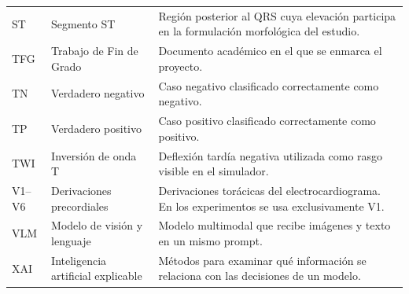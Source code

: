 {\begin{longtable}{@{}>{\raggedright\arraybackslash}p{2.20cm}>{\raggedright\arraybackslash}p{4.10cm}>{\raggedright\arraybackslash}p{7.95cm}@{}}
ST & Segmento ST & Región posterior al QRS cuya elevación participa en la formulación morfológica del estudio. \\
TFG & Trabajo de Fin de Grado & Documento académico en el que se enmarca el proyecto. \\
TN & Verdadero negativo & Caso negativo clasificado correctamente como negativo. \\
TP & Verdadero positivo & Caso positivo clasificado correctamente como positivo. \\
TWI & Inversión de onda T & Deflexión tardía negativa utilizada como rasgo visible en el simulador. \\
V1--V6 & Derivaciones precordiales & Derivaciones torácicas del electrocardiograma. En los experimentos se usa exclusivamente V1. \\
VLM & Modelo de visión y lenguaje & Modelo multimodal que recibe imágenes y texto en un mismo prompt. \\
XAI & Inteligencia artificial explicable & Métodos para examinar qué información se relaciona con las decisiones de un modelo. \\
\end{longtable}
}
